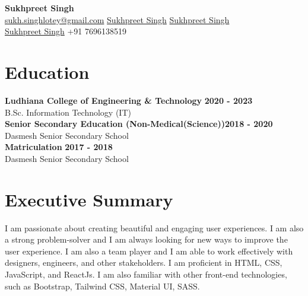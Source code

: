 \documentclass[letterpaper, 11pt]{article}
\newcommand{\iconSpace}{\hspace{1px}}
\newcommand{\hSpace}{\hspace{8px}}
\newcommand{\secStartSpace}{\vspace{3pt}}
\newcommand{\secEndSpace}{\vspace{5pt}}
\newcommand{\spaceCollapse}{\vspace{-5pt}}
\begin{document}
\begin{center} 
	{\Large \textbf{Sukhpreet Singh}}\\
	\vspace{1px}
	{\footnotesize
		 \href{mailto:joesmith@gmail.com}{sukh.singhlotey@gmail.com} 
		\hSpace
		 \iconSpace \href{https://sukhlotey.github.io/}{Sukhpreet Singh} 
		\hSpace 
		 \hspace{.1px} \href{https://www.linkedin.com/in/sukhpreetlotey/}{Sukhpreet Singh} 
		\hSpace
		}\\
	{\footnotesize
		 \iconSpace \href{https://github.com/sukhlotey}{Sukhpreet Singh}
		\hSpace 
		 \iconSpace
		+91 7696138519
	}
\end{center}
\spaceCollapse


\section{\color{blue} \textbf{Education}}
\secStartSpace

\begin{addmargin}[1em]{1em}
	\textbf{Ludhiana College of Engineering & Technology} \hfill \textbf{2020 - 2023}\\
	\setlength\parindent{1cm} B.Sc. Information Technology (IT)\\
        \textbf{Senior Secondary Education (Non-Medical(Science))}\hfill \textbf{2018 - 2020}\\
        \setlength\parindent{1cm} Dasmesh Senior Secondary School\\
        \textbf{  Matriculation }\hfill \textbf{2017 - 2018}\\
        \setlength\parindent{1cm} Dasmesh Senior Secondary School\\
\end{addmargin}
\secEndSpace


\section{\color{blue} \textbf{Executive Summary}}
\secStartSpace
I am passionate about creating beautiful and engaging user experiences. I am also a strong problem-solver and I am always looking for new ways to improve the user experience. I am also a team player and I am able to work effectively with designers, engineers, and other stakeholders. I am proficient in HTML, CSS, JavaScript, and ReactJs. I am also familiar with other front-end technologies, such as Bootstrap, Tailwind CSS, Material UI, SASS.
\secEndSpace
\end{document}
